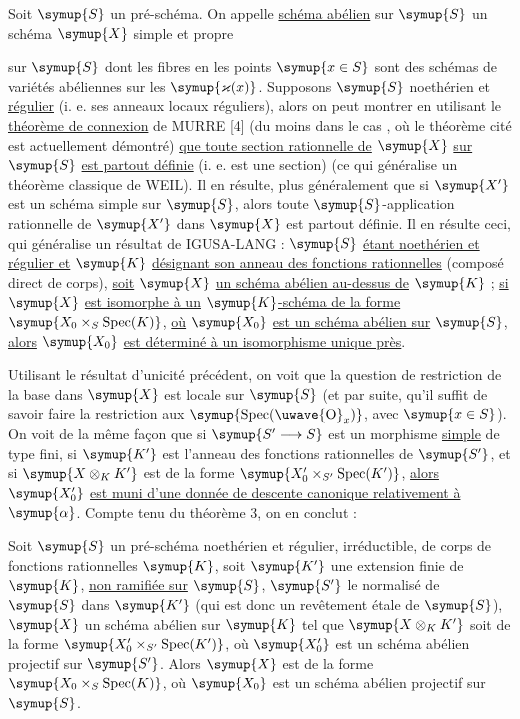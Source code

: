  Soit $\symup{S}$ un pré-schéma. On appelle \uline{schéma abélien} sur $\symup{S}$ un schéma $\symup{X}$ simple
et propre

sur $\symup{S}$ dont les fibres en les points $\symup{x\in S}$ sont des schémas de variétés
abéliennes sur les $\symup{\varkappa(x)}$. Supposons $\symup{S}$ noethérien et \uline{régulier} (i. e. ses
anneaux locaux réguliers), alors on peut montrer en utilisant le \uline{théorème de connexion} de MURRE [4] (du moins dans le cas , où
le théorème cité est actuellement démontré) \uline{que toute section rationnelle de}
$\symup{X}$ \uline{sur} $\symup{S}$ \uline{est partout définie} (i. e. est une section) (ce qui généralise un
théorème classique de WEIL). Il en résulte, plus généralement que si $\symup{X'}$ est
un schéma simple sur $\symup{S}$, alors toute $\symup{S}$-application rationnelle de $\symup{X'}$ dans
$\symup{X}$ est partout définie. Il en résulte ceci, qui généralise un résultat de
IGUSA-LANG : $\symup{S}$ \uline{étant noethérien et régulier et} $\symup{K}$ \uline{désignant
son anneau des fonctions rationnelles} (composé direct de corps), \uline{soit} $\symup{X}$ \uline{un
schéma abélien au-dessus de} $\symup{K}$ ; \uline{si} $\symup{X}$ \uline{est isomorphe à un} $\symup{K}$\uline{-schéma de la
forme} $\symup{X_0\times_S\operatorname{Spec}(K)}$, \uline{où} $\symup{X_0}$ \uline{est un schéma abélien sur}
$\symup{S}$, \uline{alors} $\symup{X_0}$ \uline{est déterminé à un isomorphisme unique près}.

Utilisant le résultat d'unicité précédent, on voit que la question de
restriction de la base dans $\symup{X}$ est locale sur $\symup{S}$ (et par suite, qu'il suffit
de savoir faire la restriction aux $\symup{\operatorname{Spec}(\text{\uwave{O}}_x)}$, avec
$\symup{x\in S}$). On voit de la même façon que si
$\symup{S'\longrightarrow S}$ est un morphisme \uline{simple} de type fini, si $\symup{K'}$ est
l'anneau des fonctions rationnelles de $\symup{S'}$, et si $\symup{X\otimes_KK'}$ est de la
forme $\symup{X'_0\times_{S'}\operatorname{Spec}(K')}$, \uline{alors} $\symup{X'_0}$ \uline{est muni d'une
donnée de descente canonique relativement à} $\symup{\alpha}$. Compte tenu du théorème
3, on en conclut :

 Soit $\symup{S}$ un pré-schéma noethérien et régulier,
irréductible, de corps de fonctions rationnelles $\symup{K}$, soit $\symup{K'}$ une extension
finie de $\symup{K}$, \uline{non ramifiée sur} $\symup{S}$, $\symup{S'}$ le normalisé de $\symup{S}$ dans $\symup{K'}$ (qui est
donc un revêtement étale de $\symup{S}$), $\symup{X}$ un schéma abélien sur $\symup{K}$ tel que
$\symup{X\otimes_KK'}$ soit de la forme
$\symup{X'_0\times_{S'}\operatorname{Spec}(K')}$, où $\symup{X'_0}$ est un schéma abélien
projectif sur $\symup{S'}$. Alors $\symup{X}$ est de la forme
$\symup{X_0\times_S\operatorname{Spec}(K)}$, où $\symup{X_0}$ est un schéma abélien projectif
sur $\symup{S}$.

